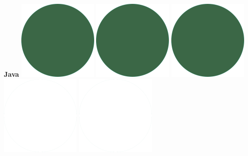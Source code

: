 \documentclass[]{commands}
\begin{document}
\begin{aside}
\textbf{Java}\hfill
\includegraphics[scale=0.11]{img/IPSGreenDots.png}
\includegraphics[scale=0.11]{img/IPSGreenDots.png}
\includegraphics[scale=0.11]{img/IPSGreenDots.png}
\includegraphics[scale=0.11]{img/WhiteDots.png}
\includegraphics[scale=0.11]{img/WhiteDots.png}


\end{aside}
\end{document}
